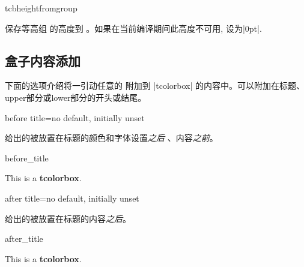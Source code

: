 \begin{docCommand}[doc new=2015-11-27]{tcbheightfromgroup}{}

保存等高组  的高度到 。如果在当前编译期间此高度不可用,
  设为|0pt|.
\end{docCommand}






\subsection{盒子内容添加}\label{subsec:contentadditions}

下面的选项介绍将一引动任意的  附加到 |tcolorbox| 的内容中。可以附加在标题、upper部分或lower部分的开头或结尾。

\begin{docTcbKey}{before title}{=}{no default, initially unset}

给出的被放置在标题的颜色和字体设置\emph{之后} 、内容\emph{之前}。
\begin{exdispExample}{before_title}

\begin{tcolorbox}[title=My title]
This is a \textbf{tcolorbox}.
\end{tcolorbox}
\end{exdispExample}
\end{docTcbKey}


\begin{docTcbKey}{after title}{=}{no default, initially unset}

给出的被放置在标题的内容\emph{之后}。
\begin{exdispExample}{after_title}

\begin{tcolorbox}[title=My title]
This is a \textbf{tcolorbox}.
\end{tcolorbox}
\end{exdispExample}
\end{docTcbKey}




